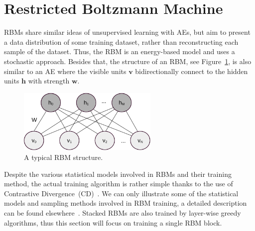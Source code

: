 \section{Restricted Boltzmann Machine}
\label{sec:rbm}
RBMs share similar ideas of unsupervised learning with AEs, but aim to present a data distribution of some training dataset, rather than reconstructing each sample of the dataset.
Thus, the RBM is an energy-based model and uses a stochastic approach.
Besides that, the structure of an RBM, see Figure~\ref{fig:RBM}, is also similar to an AE where the visible units $\mathbf{v}$ bidirectionally connect to the hidden units $\mathbf{h}$ with strength $\mathbf{w}$.


\begin{figure}[hbt]
	\centering
	\includegraphics[width=0.6\textwidth]{pics_sdlm/rbm_o.pdf}
	\caption{A typical RBM structure.}
	\label{fig:RBM}
\end{figure}

Despite the various statistical models involved in RBMs and their training method, the actual training algorithm is rather simple thanks to the use of Contrastive Divergence~(CD)~\citep{hinton2002training}.
We can only illustrate some of the statistical models and sampling methods involved in RBM training, a detailed description can be found elsewhere~\citep{fischer2012introduction}. 
Stacked RBMs are also trained by layer-wise greedy algorithms, thus this section will focus on training a single RBM block.

